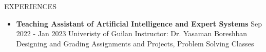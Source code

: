 \documentclass[]{CV}
\begin{document}
\begin{section}{EXPERIENCES}
\begin{multicols}{2}
\begin{itemize}
\item {\textbf{Teaching Assistant of Artificial Intelligence and Expert Systems} \newline Sep 2022 - Jan 2023 \newline Univeristy of Guilan \newline Instructor: Dr. Yasaman Boreshban \newline Designing and Grading Assignments and Projects, Problem Solving Classes}

\end{itemize}
\end{multicols}
\end{section}
\end{document}
